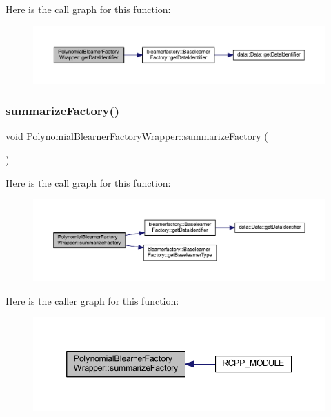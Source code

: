 Here is the call graph for this function\+:\nopagebreak
\begin{figure}[H]
\begin{center}
\leavevmode
\includegraphics[width=350pt]{class_polynomial_blearner_factory_wrapper_a1711f3a9554faf63a03bf625fe39491a_cgraph}
\end{center}
\end{figure}
\mbox{\label{class_polynomial_blearner_factory_wrapper_a299f322f5ffddec00791bbba97c92093}} 
\subsubsection{\texorpdfstring{summarize\+Factory()}{summarizeFactory()}}
{\footnotesize\ttfamily void Polynomial\+Blearner\+Factory\+Wrapper\+::summarize\+Factory (\begin{DoxyParamCaption}{ }\end{DoxyParamCaption})\hspace{0.3cm}{\ttfamily [inline]}}

Here is the call graph for this function\+:\nopagebreak
\begin{figure}[H]
\begin{center}
\leavevmode
\includegraphics[width=350pt]{class_polynomial_blearner_factory_wrapper_a299f322f5ffddec00791bbba97c92093_cgraph}
\end{center}
\end{figure}
Here is the caller graph for this function\+:\nopagebreak
\begin{figure}[H]
\begin{center}
\leavevmode
\includegraphics[width=346pt]{class_polynomial_blearner_factory_wrapper_a299f322f5ffddec00791bbba97c92093_icgraph}
\end{center}
\end{figure}


